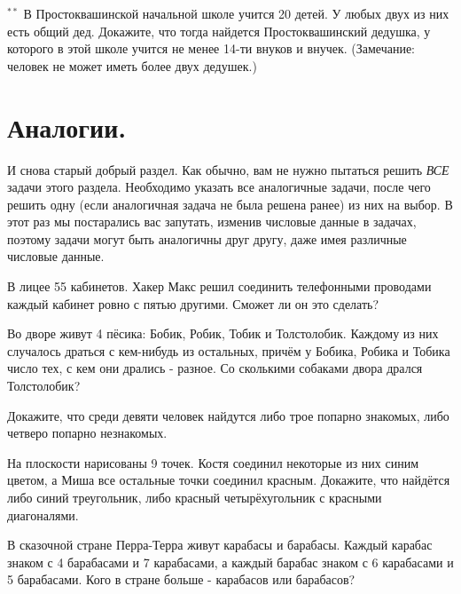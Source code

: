 \begin{thm} $^{**}$
    В Простоквашинской начальной школе учится 20 детей. У любых двух из них есть общий дед. Докажите, что тогда найдется Простоквашинский дедушка, у которого в этой школе учится не менее 14-ти внуков и внучек. (Замечание: человек не может иметь более двух дедушек.)
\end{thm}

\newpage

\section{Аналогии.}

И снова старый добрый раздел. Как обычно, вам не нужно пытаться решить \textit{ВСЕ} задачи этого раздела. Необходимо указать все аналогичные задачи, после чего решить одну (если аналогичная задача не была решена ранее) из них на выбор. В этот раз мы постарались вас запутать, изменив числовые данные в задачах, поэтому задачи могут быть аналогичны друг другу, даже имея различные числовые данные.

\begin{thm}
    В лицее 55 кабинетов. Хакер Макс решил соединить телефонными проводами каждый кабинет ровно с пятью другими. Сможет ли он это сделать?
\end{thm}

\begin{thm}
    Во дворе живут 4 пёсика: Бобик, Робик, Тобик и Толстолобик. Каждому из них случалось драться с кем-нибудь из остальных, причём у Бобика, Робика и Тобика число тех, с кем они дрались - разное. Со сколькими собаками двора дрался Толстолобик?
\end{thm}

\begin{thm}
    Докажите, что среди девяти человек найдутся либо трое попарно знакомых, либо четверо попарно незнакомых.
\end{thm}

\begin{thm}
    На плоскости нарисованы 9 точек. Костя соединил некоторые из них синим цветом, а Миша все остальные точки соединил красным. Докажите, что найдётся либо синий треугольник, либо красный четырёхугольник с красными диагоналями.
\end{thm}

\begin{thm}
    В сказочной стране Перра-Терра живут карабасы и барабасы. Каждый карабас знаком с 4 барабасами и 7 карабасами, а каждый барабас знаком с 6 карабасами и 5 барабасами. Кого в стране больше - карабасов или барабасов?
\end{thm}

